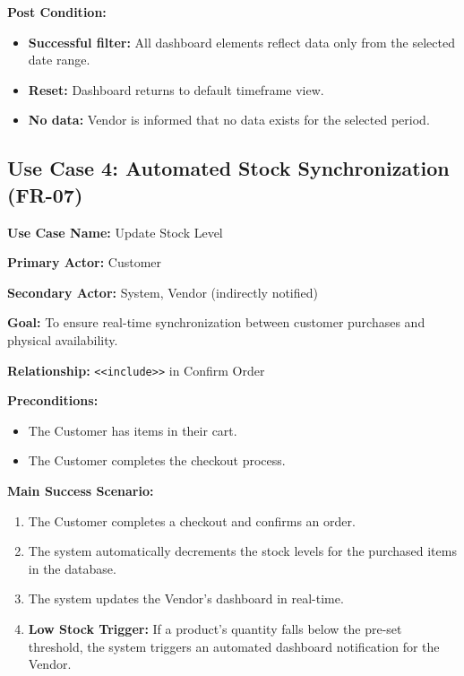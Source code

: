\textbf{Post Condition:}
\begin{itemize}
    \item \textbf{Successful filter:} All dashboard elements reflect data only from the selected date range.
    \item \textbf{Reset:} Dashboard returns to default timeframe view.
    \item \textbf{No data:} Vendor is informed that no data exists for the selected period.
\end{itemize}


\subsection*{Use Case 4: Automated Stock Synchronization (FR-07)}

\textbf{Use Case Name:} Update Stock Level

\textbf{Primary Actor:} Customer

\textbf{Secondary Actor:} System, Vendor (indirectly notified)

\textbf{Goal:} To ensure real-time synchronization between customer purchases and physical availability.

\textbf{Relationship:} \texttt{\textless\textless include\textgreater\textgreater} in Confirm Order

\textbf{Preconditions:}
\begin{itemize}
    \item The Customer has items in their cart.
    \item The Customer completes the checkout process.
\end{itemize}

\textbf{Main Success Scenario:}
\begin{enumerate}
    \item The Customer completes a checkout and confirms an order.
    \item The system automatically decrements the stock levels for the purchased items in the database.
    \item The system updates the Vendor's dashboard in real-time.
    \item \textbf{Low Stock Trigger:} If a product's quantity falls below the pre-set threshold, the system triggers an automated dashboard notification for the Vendor.
\end{enumerate}

